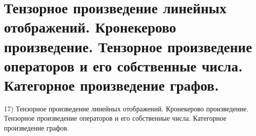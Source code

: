 \section{
 Тензорное произведение линейных отображений. Кронекерово произведение. Тензорное произведение операторов и его собственные числа. Категорное произведение графов.
}

17) Тензорное произведение линейных отображений. Кронекерово произведение. Тензорное произведение операторов и его собственные числа. Категорное произведение графов.
